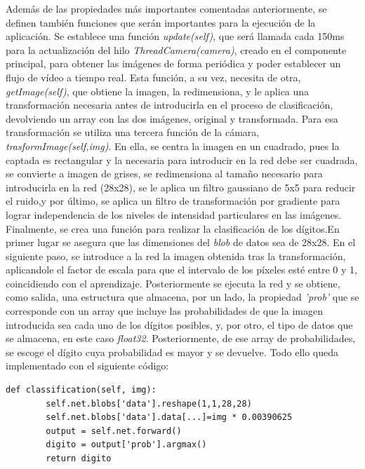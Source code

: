 Además de las propiedades más importantes comentadas anteriormente, se definen también funciones que serán importantes para la ejecución de la aplicación. Se establece una función \textit{update(self)}, que será llamada cada 150ms para la actualización del hilo \textit{ThreadCamera(camera)}, creado en el componente principal, para obtener las imágenes de forma periódica y poder establecer un flujo de vídeo a tiempo real. Esta función, a su vez, necesita de otra, \textit{getImage(self)}, que obtiene la imagen, la redimensiona, y le aplica una transformación necesaria antes de introducirla en el proceso de clasificación, devolviendo un array con las dos imágenes, original y transformada. Para esa transformación se utiliza una tercera función de la cámara, \textit{trasformImage(self,img)}. En ella, se centra la imagen en un cuadrado, pues la captada es rectangular y la necesaria para introducir en la red debe ser cuadrada, se convierte a imagen de grises, se redimensiona al tamaño necesario para introducirla en la red (28x28), se le aplica un filtro gaussiano de 5x5 para reducir el ruido,y por último, se aplica un filtro de transformación por gradiente para lograr independencia de los niveles de intensidad particulares en las imágenes.\\

Finalmente, se crea una función para realizar la clasificación de los dígitos.En primer lugar se asegura que las dimensiones del \textit{blob} de datos sea de 28x28. En el siguiente paso, se introduce a la red la imagen obtenida tras la transformación, aplicandole el factor de escala para que el intervalo de los píxeles esté entre 0 y 1, coincidiendo con el aprendizaje. Posteriormente se ejecuta la red y se obtiene, como salida, una estructura que almacena, por un lado, la propiedad \textit{'prob'} que se corresponde con un array que incluye las probabilidades de que la imagen introducida sea cada uno de los dígitos posibles, y, por otro, el tipo de datos que se almacena, en este caso \textit{float32}. Posteriormente, de ese array de probabilidades, se escoge el dígito cuya probabilidad es mayor y se devuelve. Todo ello queda implementado con el siguiente código:
\vspace{10pt}
\begin{lstlisting}[frame=single]
	def classification(self, img):
		self.net.blobs['data'].reshape(1,1,28,28)
		self.net.blobs['data'].data[...]=img * 0.00390625
		output = self.net.forward()
		digito = output['prob'].argmax()
		return digito
\end{lstlisting}

